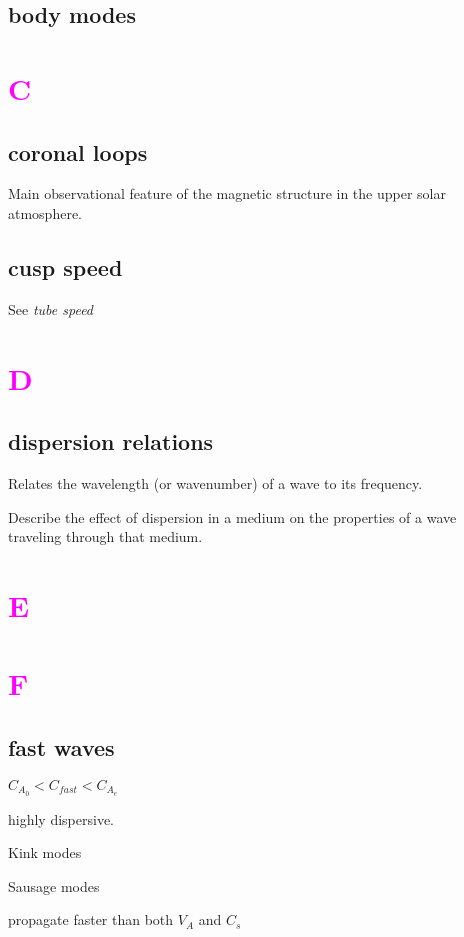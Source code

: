 \documentclass[12pt]{article}
\begin{document}
\subsection*{body modes}

\section*{\textcolor{magenta}{C}}

\subsection*{coronal loops}
\begin{itemize*}
    \item Main observational feature of the magnetic structure in the
        upper solar atmosphere.
\end{itemize*}

\subsection*{cusp speed}
See \emph{tube speed}

\section*{\textcolor{magenta}{D}}

\subsection*{dispersion relations}
\begin{itemize*}
    \item Relates the wavelength (or wavenumber) of a wave to its
        frequency.
    \item Describe the effect of dispersion in a medium on the properties
        of a wave traveling through that medium.
\end{itemize*}

\section*{\textcolor{magenta}{E}}

\section*{\textcolor{magenta}{F}}

\subsection*{fast waves}
\begin{itemize*}
    \item $C_{A_0} < C_{fast} < C_{A_e} $
    \item highly dispersive.
    \item Kink modes
    \item Sausage modes
    \item propagate faster than both $V_A$ and $C_s$
\end{itemize*}
\end{document}
